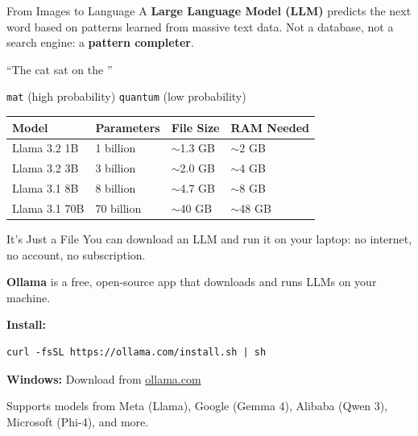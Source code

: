 \documentclass[aspectratio=169]{beamer}
\begin{document}
\begin{frame}{From Images to Language}
    A \textbf{Large Language Model (LLM)} predicts the next word based on patterns learned from massive text data. Not a database, not a search engine: a \textbf{pattern completer}.

    \vspace{0.8em}
    \begin{center}
        ``The cat sat on the \underline{\hspace{2cm}}''

        \vspace{0.3em}
        \texttt{mat} (high probability) \hspace{2em} \texttt{quantum} (low probability)
    \end{center}

    \vspace{0.8em}
    \begin{table}
        \centering
        \begin{tabular}{llll}
            \toprule
            \textbf{Model} & \textbf{Parameters} & \textbf{File Size} & \textbf{RAM Needed} \\
            \midrule
            Llama 3.2 1B  & 1 billion  & $\sim$1.3 GB & $\sim$2 GB \\
            Llama 3.2 3B  & 3 billion  & $\sim$2.0 GB & $\sim$4 GB \\
            Llama 3.1 8B  & 8 billion  & $\sim$4.7 GB & $\sim$8 GB \\
            Llama 3.1 70B & 70 billion & $\sim$40 GB  & $\sim$48 GB \\
            \bottomrule
        \end{tabular}
    \end{table}
\end{frame}


\begin{frame}[fragile]{It's Just a File}
    You can download an LLM and run it on your laptop: no internet, no account, no subscription.

    \vspace{0.8em}
    \textbf{Ollama} is a free, open-source app that downloads and runs LLMs on your machine.

    \vspace{0.8em}
    \textbf{Install:}
    \begin{lstlisting}
curl -fsSL https://ollama.com/install.sh | sh
    \end{lstlisting}
    \textbf{Windows:} Download from \href{https://ollama.com}{ollama.com}

    \vspace{0.8em}
    Supports models from Meta (Llama), Google (Gemma 4), Alibaba (Qwen 3), Microsoft (Phi-4), and more.
\end{frame}
\end{document}
